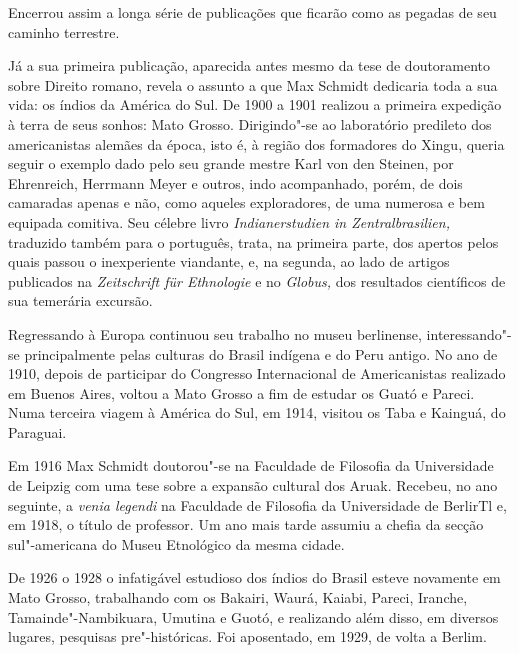 Encerrou assim a longa série de publicações que ficarão como as pegadas
de seu caminho terrestre.


Já a sua primeira publicação, aparecida antes mesmo da tese de
doutoramento sobre Direito romano, revela o assunto a que Max Schmidt
dedicaria toda a sua vida: os índios da América do Sul. De 1900 a 1901
realizou a primeira expedição à terra de seus sonhos: Mato Grosso.
Dirigindo"-se ao laboratório predileto dos americanistas alemães da
época, isto é, à região dos formadores do Xingu, queria seguir o exemplo
dado pelo seu grande mestre Karl von den Steinen, por Ehrenreich,
Herrmann Meyer e outros, indo acompanhado, porém, de dois camaradas
apenas e não, como aqueles exploradores, de uma numerosa e bem equipada
comitiva. Seu célebre livro \emph{Indianerstudien in Zentralbrasilien,}
traduzido também para o português, trata, na primeira parte, dos apertos
pelos quais passou o inexperiente viandante, e, na segunda, ao lado de
artigos publicados na \emph{Zeitschrift für Ethnologie} e no
\emph{Globus,} dos resultados científicos de sua temerária excursão.

Regressando à Europa continuou seu trabalho no museu berlinense,
interessando"-se principalmente pelas culturas do Brasil indígena e do
Peru antigo. No ano de 1910, depois de participar do Congresso
Internacional de Americanistas realizado em Buenos Aires, voltou a Mato
Grosso a fim de estudar os Guató e Pareci. Numa terceira viagem à
América do Sul, em 1914, visitou os Taba e Kainguá, do Paraguai.

Em 1916 Max Schmidt doutorou"-se na Faculdade de Filosofia da
Universidade de Leipzig com uma tese sobre a expansão cultural dos
Aruak. Recebeu, no ano seguinte, a \emph{venia legendi} na Faculdade de
Filosofia da Universidade de BerlirTl e, em 1918, o título de professor.
Um ano mais tarde assumiu a chefia da secção sul"-americana do Museu
Etnológico da mesma cidade.

De 1926 o 1928 o infatigável estudioso dos índios do Brasil esteve
novamente em Mato Grosso, trabalhando com os Bakairi, Waurá, Kaiabi,
Pareci, Iranche, Tamainde"-Nambikuara, Umutina e Guotó, e realizando além
disso, em diversos lugares, pesquisas pre"-históricas. Foi aposentado, em
1929, de volta a Berlim.

